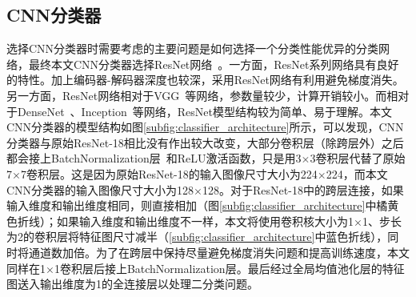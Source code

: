 \subsection{CNN分类器}\label{subsec:cnn_classifier_model}
选择CNN分类器时需要考虑的主要问题是如何选择一个分类性能优异的分类网络，最终本文CNN分类器选择ResNet网络~\cite{he2016deep}。一方面，ResNet系列网络具有良好的特性。加上编码器-解码器深度也较深，采用ResNet网络有利用避免梯度消失。另一方面，ResNet网络相对于VGG~\cite{simonyan2014very}等网络，参数量较少，计算开销较小。而相对于DenseNet~\cite{huang2017densely}、Inception~\cite{Szegedy2015RethinkingTI}等网络，ResNet模型结构较为简单、易于理解。本文CNN分类器的模型结构如图\ref{subfig:classifier_architecture}所示，可以发现，CNN分类器与原始ResNet-18相比没有作出较大改变，大部分卷积层（除跨层外）之后都会接上BatchNormalization层~\cite{ioffe2015batch}和ReLU激活函数，只是用3$\times$3卷积层代替了原始7$\times$7卷积层。这是因为原始ResNet-18的输入图像尺寸大小为224$\times$224，而本文CNN分类器的输入图像尺寸大小为128$\times$128。对于ResNet-18中的跨层连接，如果输入维度和输出维度相同，则直接相加（图\ref{subfig:classifier_architecture}中橘黄色折线）；如果输入维度和输出维度不一样，本文将使用卷积核大小为1$\times$1、步长为2的卷积层将特征图尺寸减半（\ref{subfig:classifier_architecture}中蓝色折线），同时将通道数加倍。为了在跨层中保持尽量避免梯度消失问题和提高训练速度，本文同样在1$\times$1卷积层后接上BatchNormalization层。最后经过全局均值池化层的特征图送入输出维度为1的全连接层以处理二分类问题。
